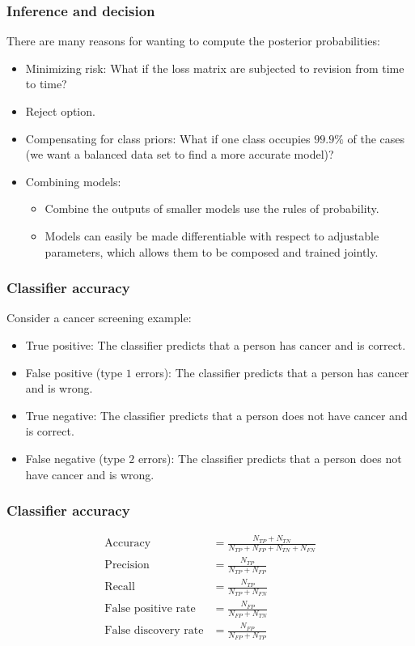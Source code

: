 \documentclass{beamer}
\begin{document}
\begin{frame}
    \frametitle{Inference and decision}
    There are many reasons for wanting to compute the posterior probabilities:
    \begin{itemize}
        \item Minimizing risk: What if the loss matrix are subjected to revision from time to time?
        \item Reject option.
        \item Compensating for class priors: What if one class occupies $99.9\%$ of the cases (we want a balanced data set to find a more accurate model)?
        \item Combining models:
        \begin{itemize}
            \item Combine the outputs of smaller models use the rules of probability.
            \item Models can easily be made differentiable with respect to adjustable parameters, which allows them to be composed and trained jointly.
        \end{itemize}
    \end{itemize}
\end{frame}

\begin{frame}
    \frametitle{Classifier accuracy}
    Consider a cancer screening example:
    \begin{itemize}
        \item True positive: The classifier predicts that a person has cancer and is correct.
        \item False positive (type $1$ errors): The classifier predicts that a person has cancer and is wrong.
        \item True negative: The classifier predicts that a person does not have cancer and is correct.
        \item False negative (type $2$ errors): The classifier predicts that a person does not have cancer and is wrong.
    \end{itemize}
\end{frame}

\begin{frame}
    \frametitle{Classifier accuracy}
    \begin{align*}
        \textrm{Accuracy}&=\frac{N_{TP}+N_{TN}}{N_{TP}+N_{FP}+N_{TN}+N_{FN}} \\
        \textrm{Precision}&=\frac{N_{TP}}{N_{TP}+N_{FP}} \\
        \textrm{Recall}&=\frac{N_{TP}}{N_{TP}+N_{FN}} \\
        \textrm{False positive rate}&=\frac{N_{FP}}{N_{FP}+N_{TN}} \\
        \textrm{False discovery rate}&=\frac{N_{FP}}{N_{FP}+N_{TP}}
    \end{align*}
\end{frame}
\end{document}
